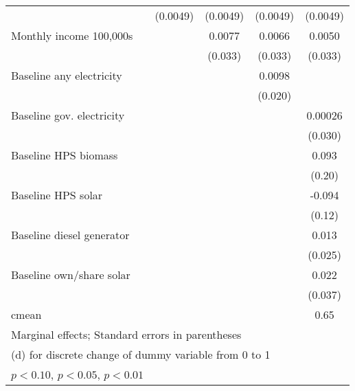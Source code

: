 \begin{table}[htbp]
\begin{tabular*}{1\hsize}{@{\hskip\tabcolsep\extracolsep\fill}l*{5}{c}}
                &                  & (0.0049)         & (0.0049)         & (0.0049)         & (0.0049)         \\
Monthly income 100,000s&                  &                  &   0.0077         &   0.0066         &   0.0050         \\
                &                  &                  &  (0.033)         &  (0.033)         &  (0.033)         \\
Baseline any electricity&                  &                  &                  &   0.0098         &                  \\
                &                  &                  &                  &  (0.020)         &                  \\
Baseline gov. electricity&                  &                  &                  &                  &  0.00026         \\
                &                  &                  &                  &                  &  (0.030)         \\
Baseline HPS biomass&                  &                  &                  &                  &    0.093         \\
                &                  &                  &                  &                  &   (0.20)         \\
Baseline HPS solar&                  &                  &                  &                  &   -0.094         \\
                &                  &                  &                  &                  &   (0.12)         \\
Baseline diesel generator&                  &                  &                  &                  &    0.013         \\
                &                  &                  &                  &                  &  (0.025)         \\
Baseline own/share solar&                  &                  &                  &                  &    0.022         \\
                &                  &                  &                  &                  &  (0.037)         \\
\midrule
cmean           &                  &                  &                  &                  &     0.65         \\
\bottomrule
\multicolumn{6}{l}{\footnotesize Marginal effects; Standard errors in parentheses}\\
\multicolumn{6}{l}{\footnotesize  (d) for discrete change of dummy variable from 0 to 1}\\
\multicolumn{6}{l}{\footnotesize \sym{*} \(p<0.10\), \sym{**} \(p<0.05\), \sym{***} \(p<0.01\)}\\
\end{tabular*}
\end{table}

